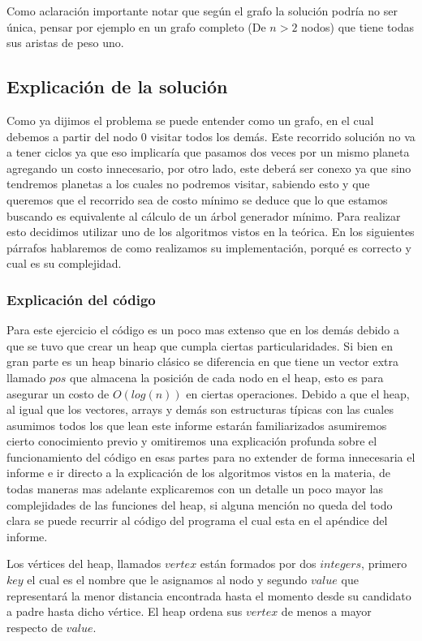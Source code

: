 Como aclaración importante notar que según el grafo la solución podría no ser única, pensar por ejemplo en un grafo completo (De $n > 2$ nodos) que tiene todas sus aristas de peso uno.

\subsection{Explicación de la solución}

Como ya dijimos el problema se puede entender como un grafo, en el cual debemos a partir del nodo 0 visitar todos los demás. Este recorrido solución no va a tener ciclos ya que eso implicaría que pasamos dos veces por un mismo planeta agregando un costo innecesario, por otro lado, este deberá ser conexo ya que sino tendremos planetas a los cuales no podremos visitar, sabiendo esto y que queremos que el recorrido sea de costo mínimo se deduce que lo que estamos buscando es equivalente al cálculo de un árbol generador mínimo. Para realizar esto decidimos utilizar uno de los algoritmos vistos en la teórica. En los siguientes párrafos hablaremos de como realizamos su implementación, porqué es correcto y cual es su complejidad.

\subsubsection{Explicación del código}

Para este ejercicio el código es un poco mas extenso que en los demás debido a que se tuvo que crear un heap que cumpla ciertas particularidades. Si bien en gran parte es un heap binario clásico se diferencia en que tiene un vector extra llamado $pos$ que almacena la posición de cada nodo en el heap, esto es para asegurar un costo de $O(log(n))$ en ciertas operaciones. Debido a que el heap, al igual que los vectores, arrays y demás son estructuras típicas con las cuales asumimos todos los que lean este informe estarán familiarizados asumiremos cierto conocimiento previo y omitiremos una explicación profunda sobre el funcionamiento del código en esas partes para no extender de forma innecesaria el informe e ir directo a la explicación de los algoritmos vistos en la materia, de todas maneras mas adelante explicaremos con un detalle un poco mayor las complejidades de las funciones del heap, si alguna mención no queda del todo clara se puede recurrir al código del programa el cual esta en el apéndice del informe.

Los v\'ertices del heap, llamados $vertex$ están formados por dos $integers$, primero $key$ el cual es el nombre que le asignamos al nodo y segundo $value$ que representará la menor distancia encontrada hasta el momento desde su candidato a padre hasta dicho vértice. El heap ordena sus $vertex$ de menos a mayor respecto de $value$.

